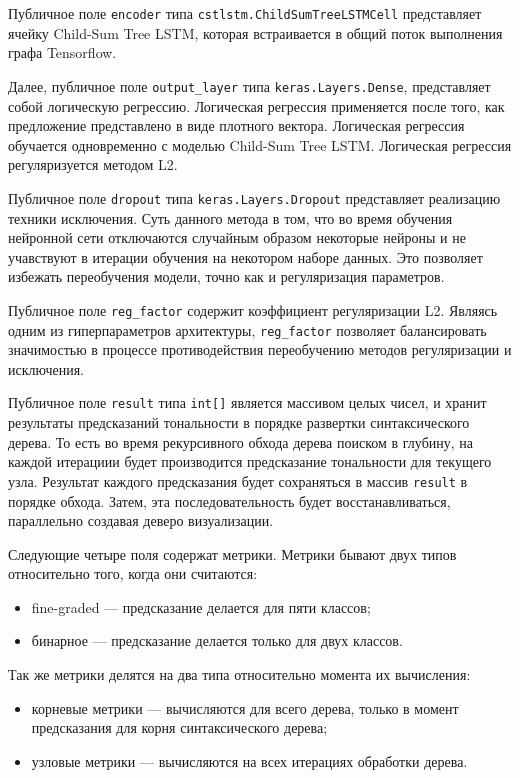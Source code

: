Публичное поле \texttt{encoder} типа \texttt{cstlstm.ChildSumTreeLSTMCell} представляет ячейку Child-Sum Tree LSTM, которая встраивается в общий поток выполнения графа Tensorflow.

Далее, публичное поле \texttt{output\_layer} типа \texttt{keras.Layers.Dense}, представляет собой логическую регрессию. Логическая регрессия применяется после того, как предложение представлено в виде плотного вектора. Логическая регрессия обучается одновременно с моделью Child-Sum Tree LSTM\@. Логическая регрессия регуляризуется методом L2.

Публичное поле \texttt{dropout} типа \texttt{keras.Layers.Dropout} представляет реализацию техники исключения. Суть данного метода в том, что во время обучения нейронной сети отключаются случайным образом некоторые нейроны и не учавствуют в итерации обучения на некотором наборе данных. Это позволяет избежать переобучения модели, точно как и регуляризация параметров.

Публичное поле \texttt{reg\_factor} содержит коэффициент регуляризации L2. Являясь одним из гиперпараметров архитектуры, \texttt{reg\_factor} позволяет балансировать значимостью в процессе противодействия переобучению методов регуляризации и исключения.

Публичное поле \texttt{result} типа \texttt{int[]} является массивом целых чисел, и хранит результаты предсказаний тональности в порядке развертки синтаксического дерева. То есть во время рекурсивного обхода дерева поиском в глубину, на каждой итерациии будет производится предсказание тональности для текущего узла. Результат каждого предсказания будет сохраняться в массив \texttt{result} в порядке обхода. Затем, эта последовательность будет восстанавливаться, параллельно создавая деверо визуализации.

Следующие четыре поля содержат метрики. Метрики бывают двух типов относительно того, когда они считаются:
\begin{itemize}
\item fine-graded --- предсказание делается для пяти классов;
\item бинарное --- предсказание делается только для двух классов.
\end{itemize}

Так же метрики делятся на два типа относительно момента их вычисления:
\begin{itemize}
\item корневые метрики --- вычисляются для всего дерева, только в момент предсказания для корня синтаксического дерева;
\item узловые метрики --- вычисляются на всех итерациях обработки дерева.
\end{itemize}

